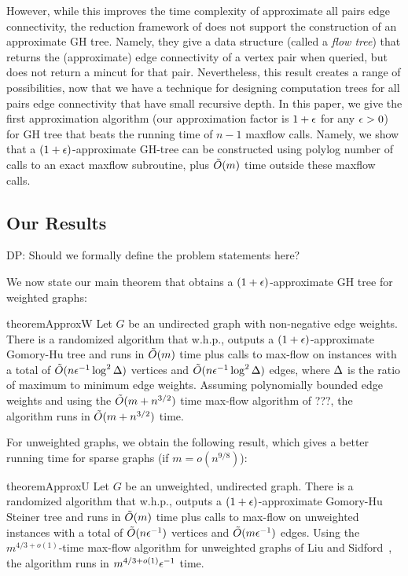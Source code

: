 However, while this improves the time complexity of approximate all pairs edge connectivity, the reduction framework of \cite{AbboudKT20b} does not support the construction of an approximate GH tree. Namely, they give a data structure (called a {\em flow tree}) that returns the (approximate) edge connectivity of a vertex pair when queried, but does not return a mincut for that pair. Nevertheless, this result creates a range of possibilities, now that we have a technique for designing computation trees for all pairs edge connectivity that have small recursive depth. In this paper, we give the first approximation algorithm (our approximation factor is $1+\epsilon$ for any $\epsilon>0$) for GH tree that beats the running time of $n-1$ maxflow calls. Namely, we show that a $(1+\epsilon)$-approximate GH-tree can be constructed using polylog number of calls to an exact maxflow subroutine, plus $\tilde{O}(m)$ time outside these maxflow calls.

\subsection{Our Results}

\alert{DP: Should we formally define the problem statements here?}

We now state our main theorem that obtains a $(1+\epsilon)$-approximate GH tree for weighted graphs:
\begin{restatable}{theorem}{ApproxW}
    Let $G$ be an undirected graph with non-negative edge weights. There is a randomized algorithm that w.h.p., outputs a $(1+\epsilon)$-approximate Gomory-Hu tree and runs in $\tilde{O}(m)$ time plus calls to max-flow on instances with a total of $\tilde{O}(n\epsilon^{-1}\log^2\Delta)$ vertices and $\tilde{O}(n\epsilon^{-1}\log^2\Delta)$ edges, where $\Delta$ is the ratio of maximum to minimum edge weights. Assuming polynomially bounded edge weights and using the $\tilde{O}(m+n^{3/2})$ time max-flow algorithm of \alert{???}, the algorithm runs in $\tilde{O}(m+n^{3/2})$ time.
\end{restatable}
For unweighted graphs, we obtain the following result, which gives a better running time for sparse graphs (if $m = o(n^{9/8})$):
\begin{restatable}{theorem}{ApproxU}
Let $G$ be an unweighted, undirected graph. There is a randomized algorithm that w.h.p., outputs a $(1+\epsilon)$-approximate Gomory-Hu Steiner tree and runs in $\tilde{O}(m)$ time plus calls to max-flow on unweighted instances with a total of $\tilde{O}(n\epsilon^{-1})$ vertices and $\tilde{O}(m\epsilon^{-1})$ edges. Using the $m^{4/3+o(1)}$-time max-flow algorithm for unweighted graphs of Liu and Sidford~\cite{liu2020faster}, the algorithm runs in $m^{4/3+o(1)}\epsilon^{-1}$ time.
\end{restatable}


